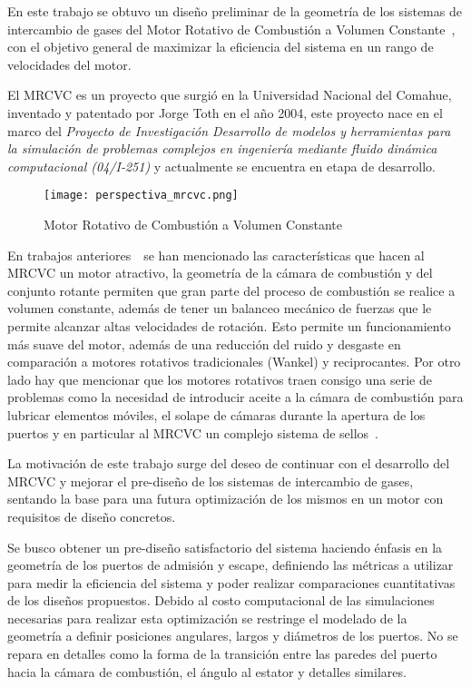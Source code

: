En este trabajo se obtuvo un diseño preliminar de la geometría de los sistemas
de intercambio de gases del Motor Rotativo de Combustión a Volumen
Constante~\parencite{toth}, con el objetivo general de maximizar la eficiencia
del sistema en un rango de velocidades del motor.
%

El MRCVC es un proyecto que surgió en la Universidad Nacional del Comahue,
inventado y patentado por Jorge Toth en el año 2004, este proyecto nace en el
marco del \emph{Proyecto de Investigación Desarrollo de modelos y herramientas
para la simulación de problemas complejos en ingeniería mediante fluido dinámica
computacional (04/I-251)} y actualmente se encuentra en etapa de desarrollo.

\begin{figure}
    \centering
    \texttt{[image: perspectiva\_mrcvc.png]}
    \caption{Motor Rotativo de Combustión a Volumen Constante}\label{fig:mrcvc}
\end{figure}

En trabajos anteriores~\parencite{lopez16}\parencite{lopez13}~se han mencionado
las características que hacen al MRCVC un motor atractivo, la geometría de la
cámara de combustión y del conjunto rotante permiten que gran parte del proceso
de combustión se realice a volumen constante, además de tener un balanceo
mecánico de fuerzas que le permite alcanzar altas velocidades de rotación.
%
Esto permite un funcionamiento más suave del motor, además de una reducción del
ruido y desgaste en comparación a motores rotativos tradicionales (Wankel) y
reciprocantes.
%
Por otro lado hay que mencionar que los motores rotativos traen consigo una
serie de problemas como la necesidad de introducir aceite a la cámara de
combustión para lubricar elementos móviles, el solape de cámaras durante la
apertura de los puertos y en particular al MRCVC un complejo sistema de
sellos~\parencite{roldan}.


La motivación de este trabajo surge del deseo de continuar con el desarrollo del
MRCVC y mejorar el pre-diseño de los sistemas de intercambio de gases, sentando
la base para una futura optimización de los mismos en un motor con requisitos de
diseño concretos.


Se busco obtener un pre-diseño satisfactorio del sistema haciendo énfasis en la
geometría de los puertos de admisión y escape, definiendo las métricas a
utilizar para medir la eficiencia del sistema y poder realizar comparaciones
cuantitativas de los diseños propuestos.
%
%
Debido al costo computacional de las simulaciones necesarias para realizar esta
optimización se restringe el modelado de la geometría a definir posiciones
angulares, largos y diámetros de los puertos.
%
No se repara en detalles como la forma de la transición entre las paredes del
puerto hacia la cámara de combustión, el ángulo al estator y detalles similares.

